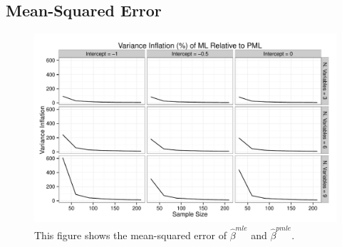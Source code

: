\documentclass[12pt]{article}
\begin{document}
\begin{appendix}
\subsection{Mean-Squared Error}

\begin{figure}[H]
\begin{center}
\includegraphics[width = \textwidth]{figs/sims-var-infl.pdf}
\caption{This figure shows the mean-squared error of $\hat{\beta}^{mle}$ and $\hat{\beta}^{pmle}$.}\label{fig:mse}
\end{center}
\end{figure}


\end{appendix}
\end{document}
